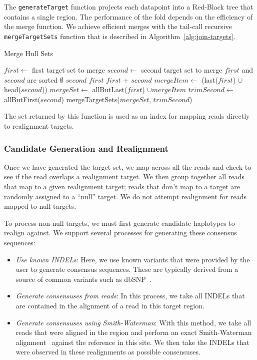 \documentclass[masters]{ucbthesis}
\begin{document}
The \texttt{generateTarget} function projects each datapoint into a Red-Black tree that contains a
single region. The performance of the fold depends on the efficiency of the merge function. We achieve
efficient merges with the tail-call recursive \texttt{mergeTargetSets} function that is described in
Algorithm~\ref{alg:join-targets}.

\begin{algorithm}
\caption{Merge Hull Sets}
\label{alg:join-targets}
\begin{algorithmic}
\STATE $first \leftarrow$ first target set to merge
\STATE $second \leftarrow$ second target set to merge
\REQUIRE $first$ and $second$ are sorted
\RETURN $\emptyset$
\RETURN $second$
\RETURN $first$
\ELSE
{}
\RETURN $first$ + $second$
\ELSE
\STATE $mergeItem \leftarrow$ (last($first$) $\cup$ head($second$))
\STATE $mergeSet \leftarrow$ allButLast($first$) $\cup mergeItem$
\STATE $trimSecond \leftarrow$ allButFirst($second$)
\RETURN mergeTargetSets($mergeSet$, $trimSecond$)
\ENDIF
\ENDIF
\end{algorithmic}
\end{algorithm}

The set returned by this function is used as an index for mapping reads directly to realignment targets.

\subsubsection{Candidate Generation and Realignment}
\label{sec:candidate-generation-realignment}

Once we have generated the target set, we map across all the reads and check to see if the read overlaps
a realignment target. We then group together all reads that map to a given realignment target; reads that
don't map to a target are randomly assigned to a ``null'' target. We do not attempt realignment for reads mapped
to null targets.

To process non-null targets, we must first generate candidate haplotypes to realign against. We support several
processes for generating these consensus sequences:

\begin{itemize}
\item \emph{Use known INDELs}: Here, we use known variants that were provided by the user to generate
consensus sequences. These are typically derived from a source of common variants such as dbSNP~\cite{sherry01}.
\item \emph{Generate consensuses from reads}: In this process, we take all INDELs that are contained in
the alignment of a read in this target region.
\item \emph{Generate consensuses using Smith-Waterman}: With this method, we take all reads that were
aligned in the region and perform an exact Smith-Waterman alignment~\cite{smith81} against the reference in this site. We
then take the INDELs that were observed in these realignments as possible consensuses. 
\end{itemize}
\end{document}

